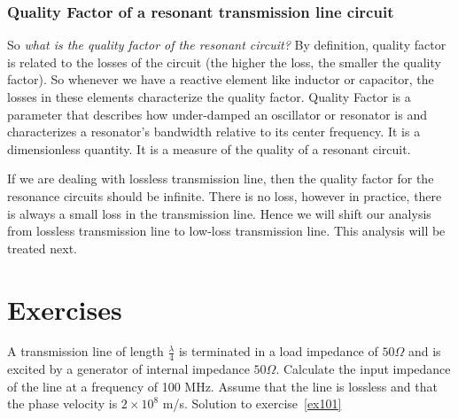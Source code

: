 \subsubsection{Quality Factor of a resonant transmission line circuit}
So \emph{what is the quality factor of the resonant circuit?} By definition, quality factor is related to the losses of the circuit (the higher the loss, the smaller the quality factor). So whenever we have a reactive element like inductor or capacitor, the losses in these elements characterize the quality factor. Quality Factor is a parameter that describes how under-damped an oscillator or resonator is and characterizes a resonator's bandwidth relative to its center frequency. It is a dimensionless quantity. It is a measure of the quality of a resonant circuit. 

If we are dealing with lossless transmission line, then the quality factor for the resonance circuits should be infinite. There is no loss, however in practice, there is always a small loss in the transmission line. Hence we will shift our analysis from lossless transmission line to low-loss transmission line. This analysis will be treated next.

\section*{Exercises}
\begin{ExerciseList}
\Exercise[label={ex101}]
A transmission line of length $ \frac{\lambda}{4} $ is terminated in a load impedance of $ 50 \Omega $ and is excited by a generator of internal impedance $ 50 \Omega $. Calculate the input impedance of the line at a frequency of 100 MHz. Assume that the line is lossless and that the phase velocity is $ 2 \times 10^{8} $ m/s.
\Answer
Solution to exercise~\ref{ex101}
\end{ExerciseList}
